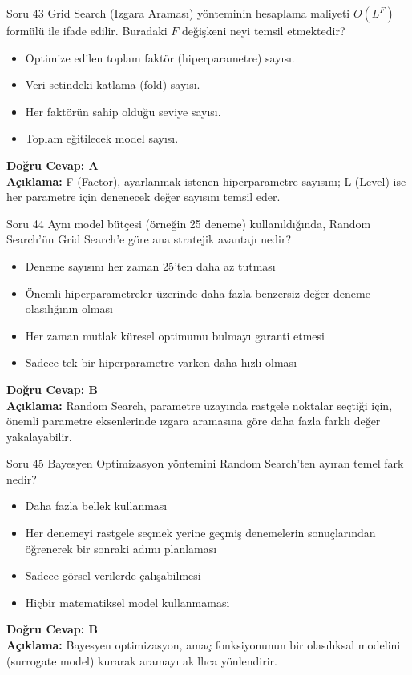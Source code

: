 \documentclass[12pt,a4paper]{article}
\begin{document}
\begin{testcard}{Soru 43}
    Grid Search (Izgara Araması) yönteminin hesaplama maliyeti $O(L^F)$ formülü ile ifade edilir. Buradaki $F$ değişkeni neyi temsil etmektedir?
    \begin{itemize}
        \item[A)] Optimize edilen toplam faktör (hiperparametre) sayısı.
        \item[B)] Veri setindeki katlama (fold) sayısı.
        \item[C)] Her faktörün sahip olduğu seviye sayısı.
        \item[D)] Toplam eğitilecek model sayısı.
    \end{itemize}
    \tcblower
    \textbf{Doğru Cevap: A} \\
    \textbf{Açıklama:} F (Factor), ayarlanmak istenen hiperparametre sayısını; L (Level) ise her parametre için denenecek değer sayısını temsil eder.
\end{testcard}

\begin{testcard}{Soru 44}
    Aynı model bütçesi (örneğin 25 deneme) kullanıldığında, Random Search'ün Grid Search'e göre ana stratejik avantajı nedir?
    \begin{itemize}
        \item[A)] Deneme sayısını her zaman 25'ten daha az tutması
        \item[B)] Önemli hiperparametreler üzerinde daha fazla benzersiz değer deneme olasılığının olması
        \item[C)] Her zaman mutlak küresel optimumu bulmayı garanti etmesi
        \item[D)] Sadece tek bir hiperparametre varken daha hızlı olması
    \end{itemize}
    \tcblower
    \textbf{Doğru Cevap: B} \\
    \textbf{Açıklama:} Random Search, parametre uzayında rastgele noktalar seçtiği için, önemli parametre eksenlerinde ızgara aramasına göre daha fazla farklı değer yakalayabilir.
\end{testcard}

\begin{testcard}{Soru 45}
    Bayesyen Optimizasyon yöntemini Random Search'ten ayıran temel fark nedir?
    \begin{itemize}
        \item[A)] Daha fazla bellek kullanması
        \item[B)] Her denemeyi rastgele seçmek yerine geçmiş denemelerin sonuçlarından öğrenerek bir sonraki adımı planlaması
        \item[C)] Sadece görsel verilerde çalışabilmesi
        \item[D)] Hiçbir matematiksel model kullanmaması
    \end{itemize}
    \tcblower
    \textbf{Doğru Cevap: B} \\
    \textbf{Açıklama:} Bayesyen optimizasyon, amaç fonksiyonunun bir olasılıksal modelini (surrogate model) kurarak aramayı akıllıca yönlendirir.
\end{testcard}
\end{document}

